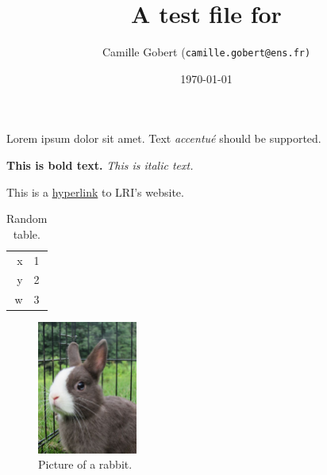 \documentclass[11pt]{article}
\title{A test file for \iLaTeX}
\author{Camille Gobert (\texttt{camille.gobert@ens.fr)}}
\date{\today}
\begin{document}
    \maketitle
    
    Lorem ipsum dolor sit amet.
    Text \emph{accentu\'e} should be supported.
    
    \textbf{This is bold text.}
    \textit{This is italic text.}
    
    This is a \href{https://www.lri.fr/}{hyperlink} to LRI's website.
    
    \begin{table}[h]
        \centering
        \begin{tabular}{rl}
            x & 1 \\
            y & 2 \\
            w & 3
        \end{tabular}
        \caption{Random table.}
        \label{tab:random}
    \end{table}
    
    \begin{figure}[h]
        \centering
        \includegraphics[width=124px, trim=15px 152px 117px 0px, clip]{img/rabbit.jpg}
        \caption{Picture of a rabbit.}
        \label{fig:rabbit}
    \end{figure}
    
    
    
\end{document}
